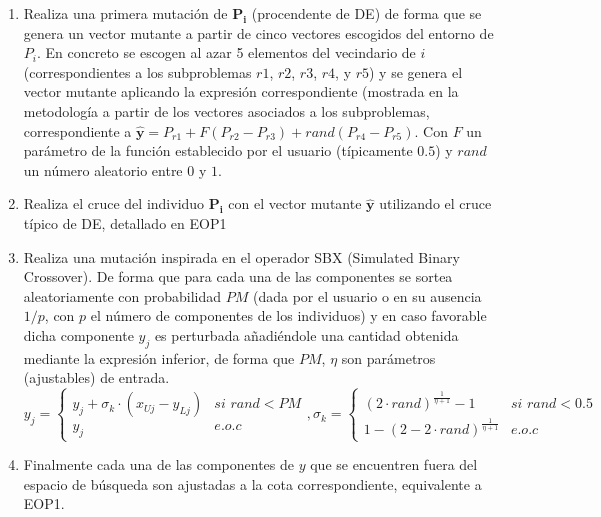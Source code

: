     \begin{enumerate}
        \item Realiza una primera mutación de $\boldsymbol{P_i}$ (procendente de DE) de forma que se genera un vector mutante a partir de cinco vectores escogidos del entorno de $P_i$. En concreto se escogen al azar 5 elementos del vecindario de $i$ (correspondientes a los subproblemas $r1$, $r2$, $r3$, $r4$, y $r5$) y se genera el vector mutante aplicando la expresión correspondiente (mostrada en la metodología a partir de los vectores asociados a los subproblemas, correspondiente a $\boldsymbol{\hat{y}} = P_{r1} + F (P_{r2} - P_{r3}) + rand  (P_{r4} - P_{r5})$. Con $F$ un parámetro de la función establecido por el usuario (típicamente $0.5$) y $rand$ un número aleatorio entre $0$ y $1$. \\
        
        \item Realiza el cruce del individuo $\boldsymbol{P_i}$ con el vector mutante $\boldsymbol{\hat{y}}$ utilizando el cruce típico de DE, detallado en EOP1\\
        
        \item Realiza una mutación inspirada en el operador SBX (Simulated Binary Crossover). De forma que para cada una de las componentes se sortea aleatoriamente con probabilidad $PM$ (dada por el usuario o en su ausencia $1/p$, con $p$ el número de componentes de los individuos) y en caso favorable dicha componente $y_j$ es perturbada añadiéndole una cantidad obtenida mediante la expresión inferior, de forma que $PM$, $\eta$ son parámetros (ajustables) de entrada. $$y_j = \left\lbrace \begin{array}{ll}
            y_j + \sigma_{k} \cdot (x_{Uj}-y_{Lj}) & \textit{si } rand < PM \\
            y_j & e.o.c
        \end{array} \right., \sigma_k = \left\lbrace \begin{array}{ll}
            (2 \cdot rand)^{\frac{1}{\eta+1}}-1 & \textit{si } rand < 0.5 \\
            1 - (2 - 2 \cdot rand)^{\frac{1}{\eta+1}} & e.o.c
        \end{array} \right.$$ 
        
        \item Finalmente cada una de las componentes de $y$ que se encuentren fuera del espacio de búsqueda son ajustadas a la cota correspondiente, equivalente a EOP1.\\
        
    \end{enumerate}
    

